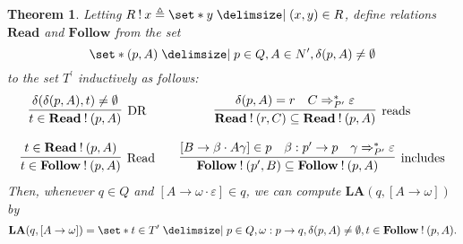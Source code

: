 \documentclass[12pt]{article}
\newtheorem{theorem}{Theorem}
\begin{document}
\begin{theorem}
Letting $ R \mathbin{!} x \triangleq \set*{ y \mid ( x , y ) \in R } $, define relations $\mathbf{Read}$ and $\mathbf{Follow}$ from the set $$ \set*{ ( p , A ) \mid p \in Q , A \in N^\prime , \delta ( p , A ) \ne \emptyset } $$ to the set $T^\prime$ inductively as follows:
\[
\begin{matrix}
\infer[\mathrm{DR}]{ t \in \mathbf{Read} \mathbin{!} ( p , A ) }{ \delta ( \delta ( p , A ) , t ) \ne \emptyset } & & \infer[\mathrm{reads}]{ \mathbf{Read} \mathbin{!} ( r , C ) \subseteq \mathbf{Read} \mathbin{!} ( p , A ) }{ \delta ( p , A ) = r & C \Rightarrow_{P^\prime}^\ast \varepsilon } \\
& & \\
\infer[\mathrm{Read}]{ t \in \mathbf{Follow} \mathbin{!} ( p , A ) }{ t \in \mathbf{Read} \mathbin{!} ( p , A ) } & & \infer[\mathrm{includes}]{ \mathbf{Follow} \mathbin{!} ( p^\prime , B ) \subseteq \mathbf{Follow} \mathbin{!} ( p , A ) }{ [ B \to \beta \cdot A \gamma ] \in p & \beta : p^\prime \to p & \gamma \Rightarrow_{P^\prime}^\ast \varepsilon }
\end{matrix}
\]
Then, whenever $q \in Q$ and $[ A \to \omega \cdot \varepsilon ] \in q$, we can compute $\mathbf{LA} (q , [ A \to \omega ])$ by
\begin{align}
\mathbf{LA} ( q , [ A \to \omega ] ) = \set*{ t \in T^\prime \mid p \in Q , \omega : p \to q , \delta ( p , A ) \ne \emptyset , t \in \mathbf{Follow} \mathbin{!} ( p , A ) } .
\end{align}
\end{theorem}
\end{document}
